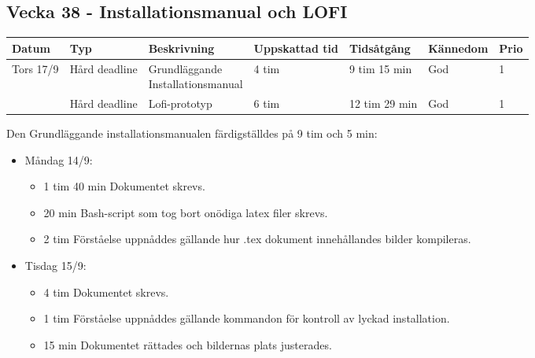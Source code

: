 \documentclass{TDP003mall}
\begin{document}
\newpage


\subsection*{Vecka 38 - Installationsmanual och LOFI}
\begin{tabularx}{\linewidth}{|l|l|l|l|l|l|l|}
  \hline
  Datum     & Typ           & Beskrivning                                        & Uppskattad tid & Tidsåtgång    & Kännedom & Prio\\
  \hline                                                    
  Tors 17/9 & Hård deadline & \makecell[tl]{Grundläggande \\Installationsmanual} & 4 tim          & 9 tim 15 min  & God      & 1\\
  \hline                                                    
            & Hård deadline & Lofi-prototyp                                      & 6 tim          & 12 tim 29 min & God      & 1\\
  \hline
\end{tabularx}

Den Grundläggande installationsmanualen färdigställdes på 9 tim och 5 min:
\begin{itemize}
  \item Måndag 14/9:
  \begin{itemize}
    \item 1 tim 40 min Dokumentet skrevs.
    \item 20 min Bash-script som tog bort onödiga latex filer skrevs.
    \item 2 tim Förståelse uppnåddes gällande hur .tex dokument innehållandes bilder kompileras.
  \end{itemize}
  \item Tisdag 15/9:
  \begin{itemize}
    \item 4 tim Dokumentet skrevs.
    \item 1 tim Förståelse uppnåddes gällande kommandon för kontroll av lyckad installation.
    \item 15 min Dokumentet rättades och bildernas plats justerades.
  \end{itemize}
\end{itemize}
\end{document}
